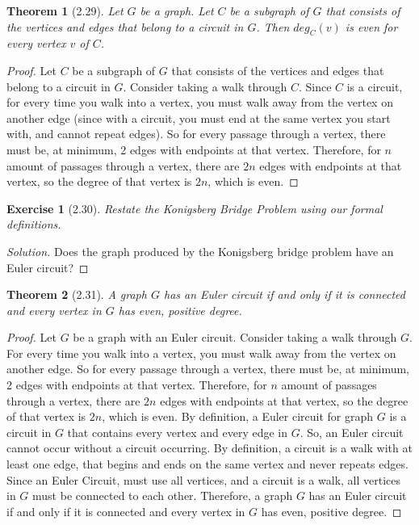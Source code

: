 \documentclass{article}
\newtheorem*{thm}{Theorem}
\newtheorem*{ex}{Exercise}
\newenvironment{solution}
  {\begin{proof}[Solution]}
  {\renewcommand{\qedsymbol}{}\end{proof}}
\begin{document}
\begin{thm}[2.29]
	Let $G$ be a graph. Let $C$ be a subgraph of $G$ that consists of the vertices and edges that belong to a circuit in $G$. Then $deg_C(v)$ is 
	even for every vertex $v$ of $C$.
\end{thm}
\begin{proof}
	 Let $C$ be a subgraph of $G$ that consists of the vertices and edges that belong to a circuit in $G$. Consider taking a walk through $C$. Since $C$ is a circuit, for every time you walk into a vertex, 
	 you must walk away from the vertex on another edge (since with a circuit, you must end at the same vertex you start with, and cannot repeat edges). So for every passage through a vertex, there  must be, at minimum, 
	 2 edges with endpoints at that vertex. Therefore, for $n$ amount of passages through a vertex, there are $2n$ edges with endpoints at that vertex, so the degree of that vertex is $2n$, which is even.
\end{proof}

\begin{ex}[2.30]
	Restate the Konigsberg Bridge Problem using our formal definitions.
\end{ex}
\begin{solution}
	Does the graph produced by the Konigsberg bridge problem have an Euler circuit?
\end{solution}

\begin{thm}[2.31]
	A graph $G$ has an Euler circuit if and only if it is connected and every vertex in $G$ has even, positive degree.
\end{thm}
\begin{proof}
	Let $G$ be a graph with an Euler circuit. Consider taking a walk through $G$. For every time you walk into a vertex, you must walk away from the vertex on another edge. So for every passage through a vertex, there
	must be, at minimum, 2 edges with endpoints at that vertex. Therefore, for $n$ amount of passages through a vertex, there are $2n$ edges with endpoints at that vertex, so the degree of that vertex is $2n$, which is even.
	By definition, a Euler circuit for graph $G$ is a circuit in $G$ that contains every vertex and every edge in $G$. So, an Euler circuit cannot occur without a circuit occurring. By definition, a circuit is a walk
	with at least one edge, that begins and ends on the same vertex and never repeats edges. Since an Euler Circuit, must use all vertices, and a circuit is a walk, all vertices in $G$ must be connected to each other.
	Therefore, a graph $G$  has an Euler circuit if and only if it is connected and every vertex in $G$ has even, positive degree. 
\end{proof}
\end{document}
